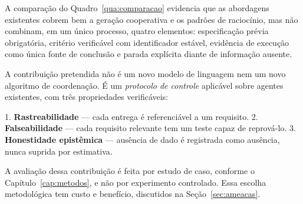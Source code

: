 A comparação do Quadro~\ref{qua:comparacao} evidencia que as abordagens existentes
cobrem bem a geração cooperativa e os padrões de raciocínio, mas não combinam, em
um único processo, quatro elementos: especificação prévia obrigatória, critério
verificável com identificador estável, evidência de execução como única fonte de
conclusão e parada explícita diante de informação ausente.

A contribuição pretendida não é um novo modelo de linguagem nem um novo algoritmo
de coordenação. É um \emph{protocolo de controle} aplicável sobre agentes
existentes, com três propriedades verificáveis:

1. \textbf{Rastreabilidade} --- cada entrega é referenciável a um requisito.
2. \textbf{Falseabilidade} --- cada requisito relevante tem um teste capaz de reprová-lo.
3. \textbf{Honestidade epistêmica} --- ausência de dado é registrada como ausência, nunca suprida por estimativa.

A avaliação dessa contribuição é feita por estudo de caso, conforme o
Capítulo~\ref{cap:metodos}, e não por experimento controlado. Essa escolha
metodológica tem custo e benefício, discutidos na Seção~\ref{sec:ameacas}.
